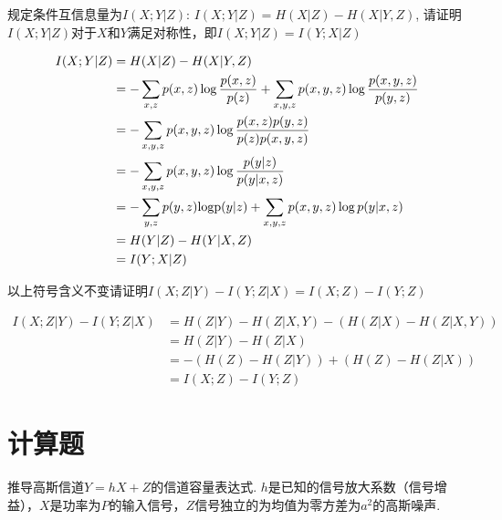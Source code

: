 \documentclass{exam}
\begin{document}
\begin{CJK*}{UTF8}{gbsn}
\begin{questions}
    \question 规定条件互信息量为$I(X;Y|Z)$:  $I(X;Y|Z) = H(X|Z) - H(X|Y,Z)$, 请证明$I(X;Y|Z)$对于$X$和$Y$满足对称性，即$I(X;Y|Z)=I(Y;X|Z)$
    \begin{solution}
    	\begin{equation*}
    	\begin{split}
    	I(X;Y|Z) &= H(X|Z)-H(X|Y,Z)\\
    	& =  - \sum\limits_{x,z} {p(x,z)\log \frac{{p(x,z)}}{{p(z)}}}  + \sum\limits_{x,y,z} {p(x,y,z)\log \frac{{p(x,y,z)}}{{p(y,z)}}} \\
    	& =  - \sum\limits_{x,y,z} {p(x,y,z)\log \frac{{p(x,z)p(y,z)}}{{p(z)p(x,y,z)}}} \\
    	& =  - \sum\limits_{x,y,z} {p(x,y,z)\log \frac{{p(y|z)}}{{p(y|x,z)}}} \\
    	& =  - \sum\limits_{y,z} {p(y,z){\mathop{\rm logp}\nolimits} (y|z)}  + \sum\limits_{x,y,z} {p(x,y,z)\log p(y|x,z)} \\
    	& = H(Y|Z) - H(Y|X,Z)\\
    	& = I(Y;X|Z)
    	\end{split}
    	\end{equation*}
    	\vspace{0.5cm}
    \end{solution}
    
    \question 以上符号含义不变请证明$I(X;Z|Y)-I(Y;Z|X)=I(X;Z)-I(Y;Z)$
    \begin{solution}
    	\begin{equation*}
    	\begin{split}
    	I(X;Z|Y) - I(Y;Z|X) &= H(Z|Y) - H(Z|X,Y) - (H(Z|X) - H(Z|X,Y))\\
    	& = H(Z|Y) - H(Z|X)\\
    	& =  - (H(Z) - H(Z|Y)) + (H(Z) - H(Z|X))\\
    	& = I(X;Z) - I(Y;Z)
    	\end{split}
    	\end{equation*}
    \end{solution}
    \end{questions}

\newpage

\section*{计算题}
    \begin{questions}
    \question 推导高斯信道$Y=hX+Z$的信道容量表达式. $h$是已知的信号放大系数（信号增益），$X$是功率为$P$的输入信号，$Z$信号独立的为均值为零方差为$a^2$的高斯噪声.
    \begin{center}
    	

\end{center}
\end{questions}
\end{CJK*}
\end{document}
